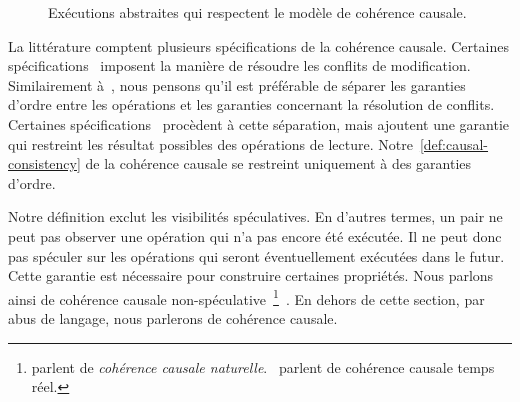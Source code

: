 \begin{figure}[htb]
\par\medskip
\begin{subfigure}{\linewidth}
    \centering
    \caption{}\label{fig:vis-vs-pre-2}
\end{subfigure}
\caption{Exécutions abstraites qui respectent le modèle de cohérence causale.}\label{fig:vis-vs-pre}
\end{figure}

La littérature comptent plusieurs spécifications de la cohérence causale.
Certaines spécifications~\autocite{ahamad_1995_causal} imposent la manière de résoudre les conflits de modification.
Similairement à~\textcite{mahajan_2011_cac}, nous pensons qu'il est préférable de séparer les garanties d'ordre entre les opérations et les garanties concernant la résolution de conflits.
Certaines spécifications~\autocite{burckhardt_eventualconsistency_2014,viotti_consistency_2016} procèdent à cette séparation, mais ajoutent une garantie qui restreint les résultat possibles des opérations de lecture.
Notre~\autoref{def:causal-consistency} de la cohérence causale se restreint uniquement à des garanties d'ordre.

Notre définition exclut les visibilités spéculatives.
En d'autres termes, un pair ne peut pas observer une opération qui n'a pas encore été exécutée.
Il ne peut donc pas spéculer sur les opérations qui seront éventuellement exécutées dans le futur.
Cette garantie est nécessaire pour construire certaines propriétés.
Nous parlons ainsi de cohérence causale non-spéculative~\footnote{\textcite{mahajan_2011_cac} parlent de \emph{cohérence causale naturelle}.~\textcite{viotti_consistency_2016} parlent de cohérence causale temps réel.}~\autocite{mahajan_2011_cac,viotti_consistency_2016}.
En dehors de cette section, par abus de langage, nous parlerons de cohérence causale.

